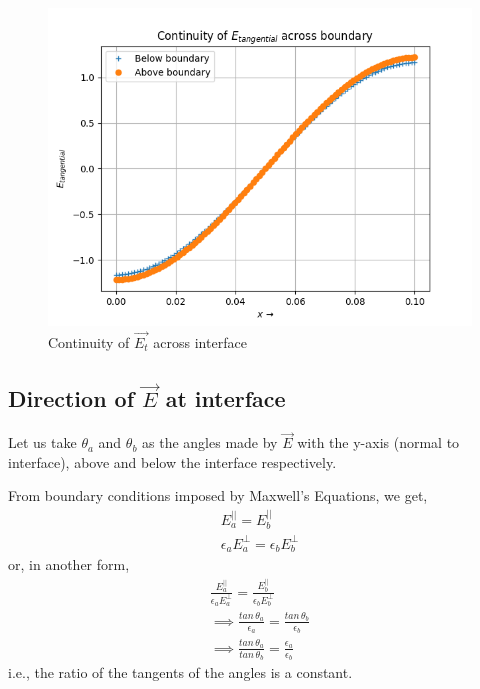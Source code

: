 \documentclass[11pt, a4paper, twoside]{report}
\begin{document}
            \begin{figure}[H]
                \centering
                \includegraphics[scale=0.75]{Fig5.png}
                \caption{Continuity of $\vec{E_t}$ across interface}
                \label{fig:Fig4}
            \end{figure}

        \subsection{Direction of $\vec{E}$ at interface}
            Let us take $\theta_a$ and $\theta_b$ as the angles made by $\vec{E}$ with the y-axis (normal to interface), above and below the interface respectively.

            From boundary conditions imposed by Maxwell's Equations, we get,
                \begin{gather}
                    E_a^{||} = E_b^{||}\\
                    \epsilon_a E_a^{\perp} = \epsilon_b E_b^{\perp}
                \end{gather}
            or, in another form,
                \begin{align}
                    \frac{E_a^{||}}{\epsilon_a E_a^{\perp}} = \frac{E_b^{||}}{\epsilon_b E_b^{\perp}}\\
                    \implies \frac{tan\,\theta_a}{\epsilon_a} = \frac{tan\,\theta_b}{\epsilon_b}\\
                    \implies \frac{tan\,\theta_a}{tan\,\theta_b} = \frac{\epsilon_a}{\epsilon_b}
                \end{align}
            i.e., the ratio of the tangents of the angles is a constant.\\
\end{document}
